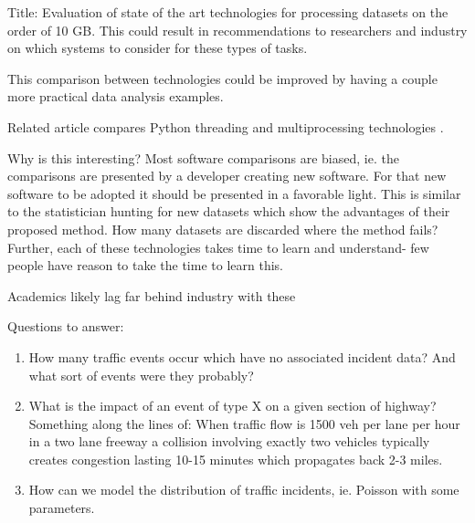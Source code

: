 \documentclass[12pt]{article}
\begin{document}
Title: Evaluation of state of the art technologies for processing datasets
on the order of 10 GB. This could result in recommendations to researchers
and industry on which systems to consider for these types of tasks.

This comparison between technologies could be improved by having a couple
more practical data analysis examples.

Related article compares Python threading and multiprocessing
technologies \cite{malakhov2016composable}.

Why is this interesting? Most software comparisons are biased, ie. the
comparisons are presented by a developer creating new software. For that
new software to be adopted it should be presented in a favorable light. 
This is similar to the statistician hunting for new datasets which show the
advantages of their proposed method. How many datasets are discarded where
the method fails?
Further, each of these technologies takes time to learn and understand-
few people have reason to take the time to learn this.

Academics likely lag far behind industry with these

Questions to answer:
\begin{enumerate}
    \item How many traffic events occur which have no associated incident
        data? And what sort of events were they probably?
    \item What is the impact of an event of type X on a given section of
        highway? Something along the lines of: When traffic flow is 1500
        veh per lane per hour in a two lane freeway a collision involving
        exactly two vehicles typically creates congestion lasting 10-15
        minutes which propagates back 2-3 miles. 
    \item How can we model the distribution of traffic incidents, ie.
        Poisson with some parameters.
\end{enumerate}
\end{document}
